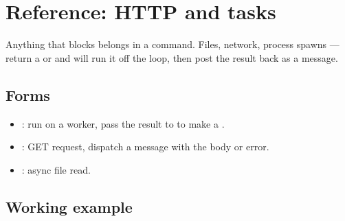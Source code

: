 \chapter{Reference: HTTP and tasks}
\label{ch:refman-task}

\begin{aside}
Anything that blocks belongs in a command. Files, network,
process spawns — return a  or 
and \maya{} will run it off the loop, then post the result
back as a message.
\end{aside}

\section{Forms}

\begin{itemize}[leftmargin=*]
  \item {}: run
     on a worker, pass the result to
     to make a .
  \item {}: GET
    request, dispatch a message with the body or error.
  \item {}:
    async file read.
\end{itemize}

\section{Working example}

